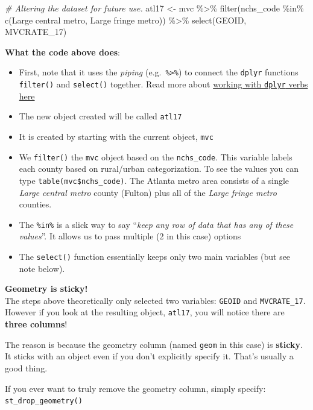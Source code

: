\documentclass[
]{book}
\newenvironment{Shaded}{\begin{snugshade}}{\end{snugshade}}
\newcommand{\CommentTok}[1]{\textcolor[rgb]{0.56,0.35,0.01}{\textit{#1}}}
\newcommand{\FunctionTok}[1]{\textcolor[rgb]{0.00,0.00,0.00}{#1}}
\newcommand{\NormalTok}[1]{#1}
\newcommand{\OtherTok}[1]{\textcolor[rgb]{0.56,0.35,0.01}{#1}}
\newcommand{\SpecialCharTok}[1]{\textcolor[rgb]{0.00,0.00,0.00}{#1}}
\newcommand{\StringTok}[1]{\textcolor[rgb]{0.31,0.60,0.02}{#1}}
\providecommand{\tightlist}{%
  \setlength{\itemsep}{0pt}\setlength{\parskip}{0pt}}
\newenvironment{rmdnote}[1]
  {
  \begin{itemize}
  \renewcommand{\labelitemi}{
    \raisebox{-.7\height}[0pt][0pt]{
      {\setkeys{Gin}{width=3em,keepaspectratio}\texttt{[image: images/\#1]}}
    }
  }
  \setlength{\fboxsep}{1em}
  \begin{note}
  \item
  }
  {
  \end{note}
  \end{itemize}
  }
\begin{document}
\begin{Shaded}
\begin{Highlighting}[]
\CommentTok{\# Altering the dataset for future use.}
\NormalTok{atl17 }\OtherTok{\textless{}{-}}\NormalTok{ mvc }\SpecialCharTok{\%\textgreater{}\%}
  \FunctionTok{filter}\NormalTok{(nchs\_code }\SpecialCharTok{\%in\%} \FunctionTok{c}\NormalTok{(}\StringTok{\textquotesingle{}Large central metro\textquotesingle{}}\NormalTok{, }\StringTok{\textquotesingle{}Large fringe metro\textquotesingle{}}\NormalTok{)) }\SpecialCharTok{\%\textgreater{}\%}
  \FunctionTok{select}\NormalTok{(GEOID, MVCRATE\_17) }
\end{Highlighting}
\end{Shaded}

\textbf{What the code above does}:

\begin{itemize}
\tightlist
\item
  First, note that it uses the \emph{piping} (e.g.~\texttt{\%\textgreater{}\%}) to connect the \texttt{dplyr} functions \texttt{filter()} and \texttt{select()} together. Read more about \href{https://mkram01.github.io/EPI563-SpatialEPI/dplyr.html}{working with \texttt{dplyr} verbs here}
\item
  The new object created will be called \texttt{atl17}
\item
  It is created by starting with the current object, \texttt{mvc}
\item
  We \texttt{filter()} the \texttt{mvc} object based on the \texttt{nchs\_code}. This variable labels each county based on rural/urban categorization. To see the values you can type \texttt{table(mvc\$nchs\_code)}. The Atlanta metro area consists of a single \emph{Large central metro} county (Fulton) plus all of the \emph{Large fringe metro} counties.
\item
  The \texttt{\%in\%} is a slick way to say ``\emph{keep any row of data that has any of these values}''. It allows us to pass multiple (2 in this case) options
\item
  The \texttt{select()} function essentially keeps only two main variables (but see note below).
\end{itemize}

\begin{rmdnote}{note}
\textbf{Geometry is sticky!}\\
The steps above theoretically only selected two variables: \texttt{GEOID} and \texttt{MVCRATE\_17}. However if you look at the resulting object, \texttt{atl17}, you will notice there are \textbf{three columns}!

The reason is because the geometry column (named \texttt{geom} in this case) is \textbf{sticky}. It sticks with an object even if you don't explicitly specify it. That's usually a good thing.

If you ever want to truly remove the geometry column, simply specify: \texttt{st\_drop\_geometry()}

\end{rmdnote}
\end{document}
